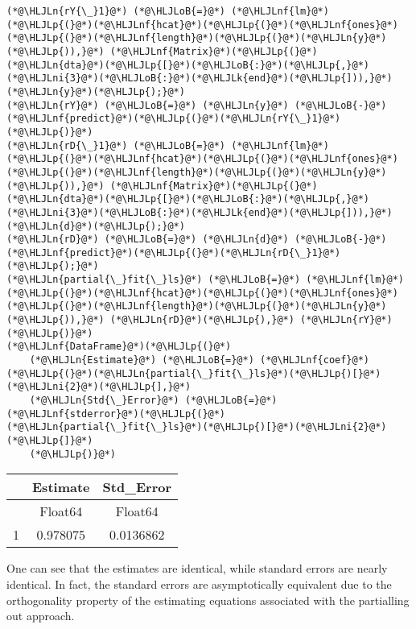 \documentclass[12pt,a4paper]{article}
\newcommand{\HLJLk}[1]{\textcolor[RGB]{148,91,176}{\textbf{#1}}}
\newcommand{\HLJLn}[1]{#1}
\newcommand{\HLJLnf}[1]{\textcolor[RGB]{66,102,213}{#1}}
\newcommand{\HLJLni}[1]{\textcolor[RGB]{59,151,46}{#1}}
\newcommand{\HLJLoB}[1]{\textcolor[RGB]{102,102,102}{\textbf{#1}}}
\newcommand{\HLJLp}[1]{#1}
\begin{document}
\begin{lstlisting}
(*@\HLJLn{rY{\_}1}@*) (*@\HLJLoB{=}@*) (*@\HLJLnf{lm}@*)(*@\HLJLp{(}@*)(*@\HLJLnf{hcat}@*)(*@\HLJLp{(}@*)(*@\HLJLnf{ones}@*)(*@\HLJLp{(}@*)(*@\HLJLnf{length}@*)(*@\HLJLp{(}@*)(*@\HLJLn{y}@*)(*@\HLJLp{)),}@*) (*@\HLJLnf{Matrix}@*)(*@\HLJLp{(}@*)(*@\HLJLn{dta}@*)(*@\HLJLp{[}@*)(*@\HLJLoB{:}@*)(*@\HLJLp{,}@*)(*@\HLJLni{3}@*)(*@\HLJLoB{:}@*)(*@\HLJLk{end}@*)(*@\HLJLp{])),}@*) (*@\HLJLn{y}@*)(*@\HLJLp{);}@*)
(*@\HLJLn{rY}@*) (*@\HLJLoB{=}@*) (*@\HLJLn{y}@*) (*@\HLJLoB{-}@*) (*@\HLJLnf{predict}@*)(*@\HLJLp{(}@*)(*@\HLJLn{rY{\_}1}@*)(*@\HLJLp{)}@*)
(*@\HLJLn{rD{\_}1}@*) (*@\HLJLoB{=}@*) (*@\HLJLnf{lm}@*)(*@\HLJLp{(}@*)(*@\HLJLnf{hcat}@*)(*@\HLJLp{(}@*)(*@\HLJLnf{ones}@*)(*@\HLJLp{(}@*)(*@\HLJLnf{length}@*)(*@\HLJLp{(}@*)(*@\HLJLn{y}@*)(*@\HLJLp{)),}@*) (*@\HLJLnf{Matrix}@*)(*@\HLJLp{(}@*)(*@\HLJLn{dta}@*)(*@\HLJLp{[}@*)(*@\HLJLoB{:}@*)(*@\HLJLp{,}@*)(*@\HLJLni{3}@*)(*@\HLJLoB{:}@*)(*@\HLJLk{end}@*)(*@\HLJLp{])),}@*) (*@\HLJLn{d}@*)(*@\HLJLp{);}@*)
(*@\HLJLn{rD}@*) (*@\HLJLoB{=}@*) (*@\HLJLn{d}@*) (*@\HLJLoB{-}@*) (*@\HLJLnf{predict}@*)(*@\HLJLp{(}@*)(*@\HLJLn{rD{\_}1}@*)(*@\HLJLp{);}@*)
(*@\HLJLn{partial{\_}fit{\_}ls}@*) (*@\HLJLoB{=}@*) (*@\HLJLnf{lm}@*)(*@\HLJLp{(}@*)(*@\HLJLnf{hcat}@*)(*@\HLJLp{(}@*)(*@\HLJLnf{ones}@*)(*@\HLJLp{(}@*)(*@\HLJLnf{length}@*)(*@\HLJLp{(}@*)(*@\HLJLn{y}@*)(*@\HLJLp{)),}@*) (*@\HLJLn{rD}@*)(*@\HLJLp{),}@*) (*@\HLJLn{rY}@*)(*@\HLJLp{)}@*)
(*@\HLJLnf{DataFrame}@*)(*@\HLJLp{(}@*)
    (*@\HLJLn{Estimate}@*) (*@\HLJLoB{=}@*) (*@\HLJLnf{coef}@*)(*@\HLJLp{(}@*)(*@\HLJLn{partial{\_}fit{\_}ls}@*)(*@\HLJLp{)[}@*)(*@\HLJLni{2}@*)(*@\HLJLp{],}@*) 
    (*@\HLJLn{Std{\_}Error}@*) (*@\HLJLoB{=}@*) (*@\HLJLnf{stderror}@*)(*@\HLJLp{(}@*)(*@\HLJLn{partial{\_}fit{\_}ls}@*)(*@\HLJLp{)[}@*)(*@\HLJLni{2}@*)(*@\HLJLp{]}@*)
    (*@\HLJLp{)}@*)
\end{lstlisting}


\begin{tabular}{r|cc}
	& Estimate & Std\_Error\\
	\hline
	& Float64 & Float64\\
	\hline
	1 & 0.978075 & 0.0136862 \\
\end{tabular}


One can see that the estimates are identical, while standard errors are nearly identical. In fact, the standard errors are asymptotically equivalent due to the orthogonality property of the estimating equations associated with the partialling out approach.
\end{document}

